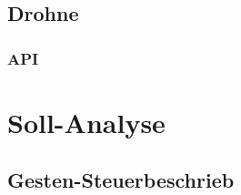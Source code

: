 \subsection{Drohne}

\subsubsection{API}


\section{Soll-Analyse}
\subsection{Gesten-Steuerbeschrieb}


